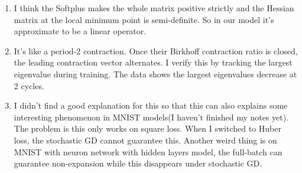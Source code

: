 \documentclass[11pt]{article}
\begin{document}
\begin{enumerate}
    \item I think the Softplus makes the whole matrix positive strictly and the Hessian matrix at the local minimum point is semi-definite. So in our model it's approximate to be a linear operator.
    \item  It's like a period-2 contraction. Once their Birkhoff contraction ratio is closed, the leading contraction vector alternates. I verify this by tracking the largest eigenvalue during training. The data shows the largest eigenvalues decrease at 2 cycles.
    \item I didn't find a good explanation for this so that this can also explains some interesting phenomenon in MNIST models(I haven't finished  my notes yet). The problem is this only works on square loss. When I switched to Huber loss, the stochastic GD cannot guarantee this. Another weird thing is on MNIST with neuron network with hidden layers model, the full-batch can guarantee non-expansion while this disappears under stochastic GD.
\end{enumerate}
\end{document}
